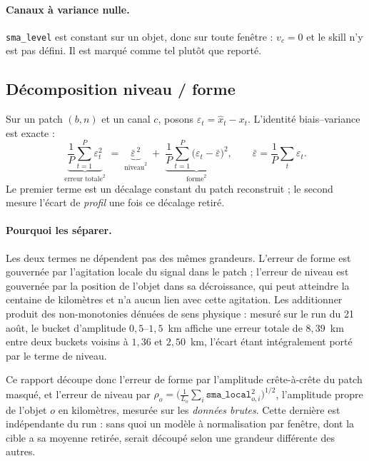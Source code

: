 \documentclass{article}
\begin{document}
\paragraph{Canaux à variance nulle.} \texttt{sma\_level} est constant sur un objet, donc sur toute fenêtre : $v_c = 0$ et le skill n'y est pas défini. Il est marqué comme tel plutôt que reporté.

\subsection{Décomposition niveau / forme}

Sur un patch $(b,n)$ et un canal $c$, posons $\varepsilon_t = \hat{x}_t - x_t$. L'identité biais--variance est exacte :
\begin{equation}
\underbrace{\frac{1}{P}\sum_{t=1}^{P}\varepsilon_t^2}_{\text{erreur totale}^2}
\;=\;
\underbrace{\bar{\varepsilon}^{\,2}}_{\text{niveau}^2}
\;+\;
\underbrace{\frac{1}{P}\sum_{t=1}^{P}\bigl(\varepsilon_t-\bar{\varepsilon}\bigr)^2}_{\text{forme}^2},
\qquad \bar{\varepsilon}=\frac{1}{P}\sum_t \varepsilon_t .
\label{eq:decomp}
\end{equation}
Le premier terme est un décalage constant du patch reconstruit ; le second mesure l'écart de \emph{profil} une fois ce décalage retiré.

\paragraph{Pourquoi les séparer.} Les deux termes ne dépendent pas des mêmes grandeurs. L'erreur de forme est gouvernée par l'agitation locale du signal dans le patch ; l'erreur de niveau est gouvernée par la position de l'objet dans sa décroissance, qui peut atteindre la centaine de kilomètres et n'a aucun lien avec cette agitation. Les additionner produit des non-monotonies dénuées de sens physique : mesuré sur le run du 21 août, le bucket d'amplitude $0{,}5$--$1{,}5$~km affiche une erreur totale de $8{,}39$~km entre deux buckets voisins à $1{,}36$ et $2{,}50$~km, l'écart étant intégralement porté par le terme de niveau.

Ce rapport découpe donc l'erreur de forme par l'amplitude crête-à-crête du patch masqué, et l'erreur de niveau par $\rho_o = \bigl(\frac{1}{L_o}\sum_i \texttt{sma\_local}_{o,i}^2\bigr)^{1/2}$, l'amplitude propre de l'objet $o$ en kilomètres, mesurée sur les \emph{données brutes}. Cette dernière est indépendante du run : sans quoi un modèle à normalisation par fenêtre, dont la cible a sa moyenne retirée, serait découpé selon une grandeur différente des autres.
\end{document}
